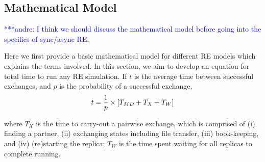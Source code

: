 \documentclass{rspublic}
\newcommand{\jhanote}[1]{ {\textcolor{red} { ***shantenu: #1 }}}
\newcommand{\alnote}[1]{ {\textcolor{blue} { ***andre: #1 }}}
\newcommand{\athotanote}[1]{ {\textcolor{green} { ***athota: #1 }}}
\newcommand{\alnote}[1]{}
\newcommand{\athotanote}[1]{}
\newcommand{\jhanote}[1]{}
\begin{document}









\subsection{Mathematical Model}
\alnote{I think we should discuss the mathematical model before going
  into the specifics of sync/async RE.}

Here we first provide a basic mathematical model for different RE
models which explains the terms involved. In this section, we aim to
develop an equation for total time to run any RE simulation. If $t$ is
the average time between successful exchanges, and $p$ is the
probability of a successful exchange,
\begin{eqnarray}
t=  {1 \over p} \times {[T_{MD} + T_{X} + T_{W}]} 
\label{eq:timebtw}
\end{eqnarray}

where $T_{X}$ is the time to carry-out a pairwise exchange, which is
comprised of (i) finding a partner, (ii) exchanging states including
file transfer, (iii) book-keeping, and (iv) (re)starting the replica;
$T_{W}$ is the time spent waiting for all replicas to complete running.
\end{document}
